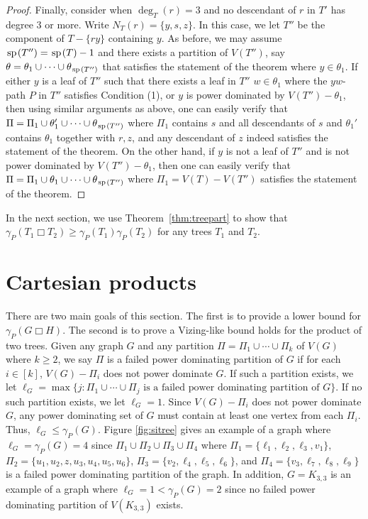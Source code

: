 \documentclass[11pt]{article}
\newcommand{\spider}{\hskip1pt \textrm{sp} \hskip1pt}
\begin{document}
\begin{proof}
Finally, consider when $\deg_T(r) = 3$ and no descendant of $r$ in $T'$ has degree $3$ or more. Write $N_T(r) = \{y, s, z\}$. In this case, we let $T''$ be the component of $T - \{ry\}$ containing $y$. As before, we may assume $\spider(T'') = \spider(T) -1$ and there exists a partition of $V(T'')$, say $\theta = \theta_1 \cup \cdots \cup \theta_{\spider(T'')}$ that satisfies the statement of the theorem where $y \in \theta_1$. If either $y$ is a leaf of $T''$ such that there exists a leaf in $T''$ $w \in \theta_1$ where the $yw$-path $P$ in $T''$ satisfies Condition (1), or $y$ is power dominated by $V(T'') - \theta_1$, then using similar arguments as above, one can easily verify that 
$\Pi = \Pi_1 \cup \theta'_1 \cup \cdots \cup \theta_{\spider(T'')}$ where $\Pi_1$ contains $s$ and all descendants of $s$ and $\theta_1'$ contains $\theta_1$ together with $r, z$, and any descendant of $z$  indeed satisfies the statement of the theorem. On the other hand, if $y$ is not a leaf of $T''$ and is not power dominated by $V(T'') - \theta_1$, then one can easily verify that $\Pi = \Pi_1 \cup \theta_1 \cup \cdots \cup \theta_{\spider(T'')}$ where $\Pi_1 = V(T) - V(T'')$ satisfies the statement of the theorem. 

\end{proof}

In the next section, we use Theorem~\ref{thm:treepart} to show that $\gamma_P(T_1\Box T_2) \ge \gamma_P(T_1)\gamma_P(T_2)$ for any trees $T_1$ and $T_2$. 

\section{Cartesian products} \label{sec:prod}
There are two main goals of this section. The first is to provide a lower bound for $\gamma_P(G\Box H)$. The second is to prove a  Vizing-like bound holds for the product of two trees. Given any graph $G$ and any partition $\Pi = \Pi_1 \cup \cdots \cup \Pi_k$ of $V(G)$ where $k\ge2$, we say $\Pi$ is a failed power dominating partition of $G$ if for each $i\in [k]$, $V(G) - \Pi_i$ does not power dominate $G$. If such a partition exists, we let $\ell_G= \max\{j: \Pi_1 \cup \cdots \cup \Pi_j \text{ is a failed power dominating partition of $G$}\}$. If no such partition exists, we let $\ell_G = 1$. Since $V(G) - \Pi_i$ does not power dominate $G$, any power dominating set of $G$ must contain at least one vertex from each $\Pi_i$. Thus, $\ell_G \leq \gamma_P(G)$. Figure \ref{fig:sitree} gives an example of a graph where $\ell_G = \gamma_P(G) = 4$ since $\Pi_1 \cup \Pi_2\cup \Pi_3\cup \Pi_4$ where $\Pi_1 = \{\ell_1, \ell_2, \ell_3, v_1\}$, $\Pi_2 = \{u_1, u_2, z, u_3, u_4, u_5, u_6\}$, $\Pi_3 = \{v_2, \ell_4, \ell_5, \ell_6\}$, and $\Pi_4 = \{v_3, \ell_7, \ell_8, \ell_9\}$ is a failed power dominating partition of the graph. In addition, $G = K_{3, 3}$ is an example of a graph where $\ell_G = 1 < \gamma_P(G) = 2$ since no failed power dominating partition of $V(K_{3, 3})$ exists.
\end{document}
